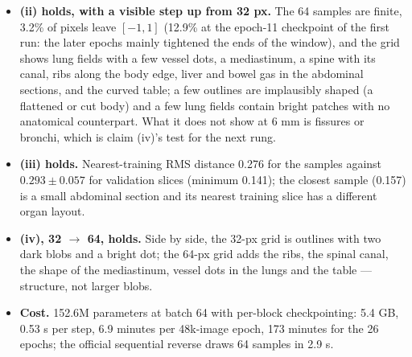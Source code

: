 \documentclass[11pt]{article}
\begin{document}
\begin{itemize}
        bright objects \emph{in the air above the chest wall} --- ECG
        electrodes and leads on the skin, a feature rare enough in the
        training split that the model has no context for it --- and slice
        2426 is additionally a shoulder-level section (humeral heads at the
        edge of the field of view). The largest first-block $|z|$ is on one
        of those bright dots in slice 1095; the failure is then a chain: the
        maximum $|z|$ after the eight blocks runs 10, 20, 60, 60, 60, 50,
        30, 600 (slice 1095) and 10, 10, 20, 20, 20, 50, 100, $2 \times
        10^{4}$ (slice 2426), i.e.\ each block's coupling, conditioned on
        an already-atypical context, predicts a small scale for a token
        that is then far from its prediction, and the last block --- whose
        log-scale is bounded at 8, a factor of 2981 --- turns a $|z|$ of
        100 into $2 \times 10^{4}$. A single latent coordinate of that size
        contributes $z^{2}/2 = 2 \times 10^{8}$ nats, which over 4096 pixels
        is $7 \times 10^{4}$ bits/dim: the whole excess is one coordinate.
        Sharper (later) checkpoints make it worse (72 $\to$ 1707 bits/dim
        on slice 1095 from epoch 20 to 26), which is why the plain mean
        \emph{rose} with training and read as over-fitting. The test split
        happens to contain no such slice (maximum 4.9 bits/dim); the rate
        is of order 1 in 2000.
  \item \textbf{(ii) holds, with a visible step up from 32 px.} The 64
        samples are finite, 3.2\% of pixels leave $[-1,1]$ (12.9\% at the
        epoch-11 checkpoint of the first run: the later epochs mainly
        tightened the ends of the window), and the grid shows lung fields
        with a few vessel dots, a mediastinum, a spine with its canal, ribs
        along the body edge, liver and bowel gas in the abdominal sections,
        and the curved table; a few outlines are implausibly shaped (a
        flattened or cut body) and a few lung fields contain bright patches
        with no anatomical counterpart. What it does not show at 6 mm is
        fissures or bronchi, which is claim (iv)'s test for the next rung.
  \item \textbf{(iii) holds.} Nearest-training RMS distance 0.276 for the
        samples against $0.293 \pm 0.057$ for validation slices (minimum
        0.141); the closest sample (0.157) is a small abdominal section
        and its nearest training slice has a different organ layout.
  \item \textbf{(iv), 32 $\to$ 64, holds.} Side by side, the 32-px grid is
        outlines with two dark blobs and a bright dot; the 64-px grid adds
        the ribs, the spinal canal, the shape of the mediastinum, vessel
        dots in the lungs and the table --- structure, not larger blobs.
  \item \textbf{Cost.} 152.6M parameters at batch 64 with per-block
        checkpointing: 5.4 GB, 0.53 s per step, 6.9 minutes per 48k-image
        epoch, 173 minutes for the 26 epochs; the official sequential
        reverse draws 64 samples in 2.9 s.
\end{itemize}
\end{document}
